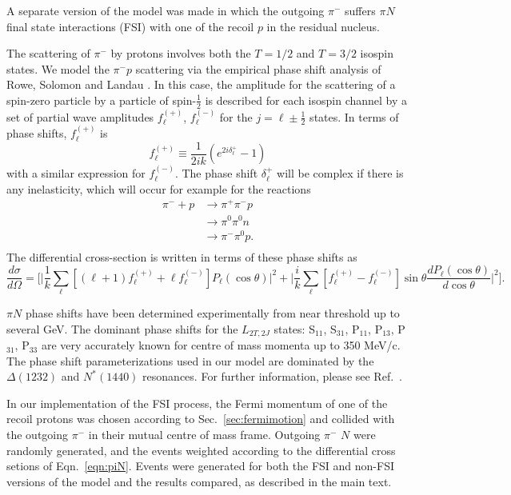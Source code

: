 A separate version of the model was made in which the outgoing $\pi^-$ suffers
$\pi N$ final state interactions (FSI) with one of the recoil $p$ in the
residual nucleus.

The scattering of $\pi^-$ by protons involves both the $T=1/2$ and $T=3/2$
isospin states.  We model the $\pi^- p$ scattering via the empirical phase
shift analysis of Rowe, Solomon and Landau \cite{rowe}.  In this case,
the amplitude for the scattering of a spin-zero particle by a particle of
spin-$\frac{1}{2}$ is described for each isospin channel by a set of partial
wave amplitudes $f^{(+)}_{\ell}$, $f^{(-)}_{\ell}$ for the
$j=\ell\pm\frac{1}{2}$ states.  In terms of phase shifts, $f^{(+)}_{\ell}$ is
\begin{equation}
f^{(+)}_{\ell}\equiv\frac{1}{2ik}(e^{2i\delta^+_{\ell}} -1)
\end{equation}
with a similar expression for $f^{(-)}_{\ell}$.  The phase shift
$\delta^+_{\ell}$ will be complex if there is any inelasticity, which will
occur for example for the reactions
\begin{equation}
\begin{split}
\pi^- + p &\rightarrow \pi^+ \pi^- p \\
          &\rightarrow \pi^0 \pi^0 n \\
          &\rightarrow \pi^- \pi^0 p. \\
\end{split}
\end{equation}
The differential cross-section is written in terms of these phase shifts as
\begin{equation}
\frac{d\sigma}{d\Omega}=\biggl[
\biggl| \frac{1}{k}\sum_{\ell}[(\ell +1) 
f^{(+)}_{\ell} +\ell f^{(-)}_{\ell}] P_{\ell}(\cos\theta)\biggr|^2 +
\biggl| \frac{i}{k}\sum_{\ell}[f^{(+)}_{\ell} -f^{(-)}_{\ell}]\sin\theta 
 \frac{d P_{\ell}(\cos\theta)}{d\cos\theta}\biggr|^2
\biggr].
\label{eqn:piN}
\end{equation}

$\pi N$ phase shifts have been determined experimentally from near threshold up
to several GeV.  The dominant phase shifts for the $L_{2T,2J}$ states:
S$_{11}$, S$_{31}$, P$_{11}$, P$_{13}$, P$_{31}$, P$_{33}$ are very accurately
known for centre of mass momenta up to 350 MeV/c.  The phase shift
parameterizations used in our model are dominated by the $\Delta(1232)$ and
$N^*(1440)$ resonances.  For further information, please see
Ref.~\cite{ericson}.

In our implementation of the FSI process, the Fermi momentum of one of the
recoil protons was chosen according to Sec.~\ref{sec:fermimotion} and collided
with the outgoing $\pi^-$ in their mutual centre of mass frame.  Outgoing
$\pi^-$ $N$ were randomly generated, and the events
weighted according to the differential cross setions of Eqn.~\ref{eqn:piN}.
Events were generated for both the FSI and non-FSI versions of the
model and the results compared, as described in the main text.







